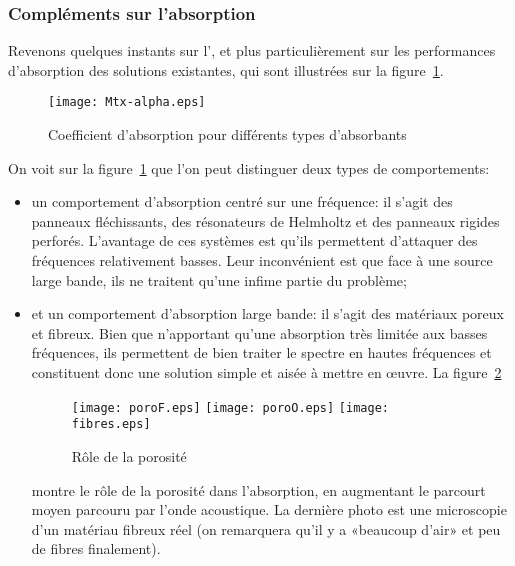 \medskip
\subsubsection{Compléments sur l'absorption}

Revenons quelques instants sur l', et plus particulièrement sur les performances d'absorption des solutions existantes, qui sont illustrées sur la figure~\ref{Fig-mtxalpha}.
\begin{figure}[h!]
\centering
\texttt{[image: Mtx-alpha.eps]}
\caption{Coefficient d'absorption pour différents types d'absorbants}\label{Fig-mtxalpha}
\end{figure}

On voit sur la figure~\ref{Fig-mtxalpha} que l'on peut distinguer deux types de comportements:
\begin{itemize}
   \item un comportement d'absorption centré sur une fréquence: il s'agit des panneaux fléchissants, des résonateurs de Helmholtz et des panneaux rigides perforés. L'avantage de ces systèmes est qu'ils permettent d'attaquer des fréquences relativement basses. Leur inconvénient est que face à une source large bande, ils ne traitent qu'une infime partie du problème;
  
   \item et un comportement d'absorption large bande: il s'agit des matériaux poreux et fibreux. Bien que n'apportant qu'une absorption très limitée aux basses fréquences, ils permettent de bien traiter le spectre en hautes fréquences et constituent donc une solution simple et aisée à mettre en œuvre. La figure~\ref{Fig-poro}
\begin{figure}[h!]
\centering
\texttt{[image: poroF.eps]}\hspace{4mm}
\texttt{[image: poroO.eps]}\hspace{4mm}
\texttt{[image: fibres.eps]}
\caption{Rôle de la porosité}\label{Fig-poro}
\end{figure}
montre le rôle de la porosité dans l'absorption, en augmentant le parcourt moyen parcouru par l'onde acoustique. La dernière photo est une microscopie d'un matériau fibreux réel (on remarquera qu'il y a «beaucoup d'air» et peu de fibres finalement).
\end{itemize}

